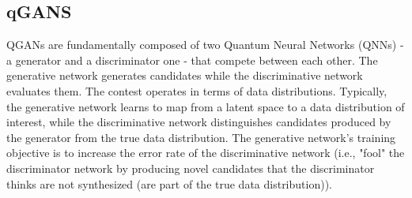\subsection{qGANS}
\label{sec:qgan}

QGANs are fundamentally composed of two Quantum Neural Networks (QNNs) - a generator and a discriminator one - that compete between each other. The generative network generates candidates while the discriminative network evaluates them. The contest operates in terms of data distributions. Typically, the generative network learns to map from a latent space to a data distribution of interest, while the discriminative network distinguishes candidates produced by the generator from the true data distribution. The generative network's training objective is to increase the error rate of the discriminative network (i.e., "fool" the discriminator network by producing novel candidates that the discriminator thinks are not synthesized (are part of the true data distribution)).
